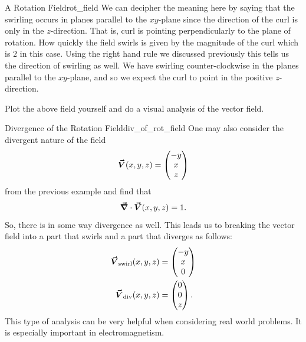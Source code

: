 \begin{ex}{A Rotation Field}{rot_field}
		        We can decipher the meaning here by saying that the swirling occurs in planes parallel to the $xy$-plane since the direction of the curl is only in the $z$-direction.  That is, curl is pointing perpendicularly to the plane of rotation.  How quickly the field swirls is given by the magnitude of the curl which is $2$ in this case.  Using the right hand rule we discussed previously this tells us the direction of swirling as well.  We have swirling counter-clockwise in the planes parallel to the $xy$-plane, and so we expect the curl to point in the positive $z$-direction.
		    
		        \end{ex}
		        
		        \begin{exercise}
		        Plot the above field yourself and do a visual analysis of the vector field.
		        \end{exercise}
		        
		        \begin{ex}{Divergence of the Rotation Field}{div_of_rot_field}
		        One may also consider the divergent nature of the field 
		        \[
		        \boldsymbol{\vec{V}}(x,y,z) = \begin{pmatrix} -y \\ x \\ z\end{pmatrix}
		        \]
		        from the previous example and find that 
		        \[
		        \boldsymbol{\vec{\nabla}} \cdot \boldsymbol{\vec{V}}(x,y,z) = 1.
		        \]
		        So, there is in some way divergence as well.  This leads us to breaking the vector field into a part that swirls and a part that diverges as follows:
		        \begin{align*}
		            \boldsymbol{\vec{V}}_\textrm{swirl}(x,y,z) &= \begin{pmatrix} -y \\ x \\ 0 \end{pmatrix}\\
		            \boldsymbol{\vec{V}}_\textrm{div}(x,y,z) &= \begin{pmatrix} 0 \\ 0 \\ z \end{pmatrix}.
		        \end{align*}
		        This type of analysis can be very helpful when considering real world problems.  It is especially important in electromagnetism.
		        \end{ex}
		        
